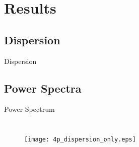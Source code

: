 \documentclass{beamer}
\begin{document}
\section{Results}
\subsection{Dispersion}
\begin{frame}{\small{Dispersion}}
\begin{figure}[!h]
\vspace*{-0.6cm}
\begin{center}
\renewcommand{\figure}{Fig.}
\label{fig:sed}
\end{center}
\end{figure}
\begin{figure}[!h]
\vspace*{-0.4cm}
\begin{center}
\renewcommand{\figure}{Fig.}
\label{fig:dispersion}
\end{center}
\end{figure}
\end{frame}


\subsection{Power Spectra}
\begin{frame}{Power Spectrum}
\begin{columns}
\begin{figure}[t]
\vspace*{-1cm}
\hspace*{-0.9cm}
\texttt{[image: 4p\_dispersion\_only.eps]}
\renewcommand{\figure}{Fig.}
\label{fig:disp_4p}
\end{figure}
\begin{figure}[t]
\vspace*{-1.2cm}
\hspace*{1.9cm}
\renewcommand{\figure}{Fig.}
\label{fig:sed}
\end{figure}
\end{columns}
\end{frame}
\end{document}
